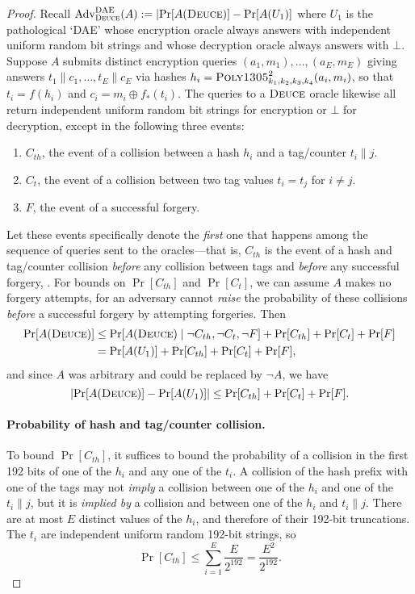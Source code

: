 \documentclass[draft]{article}
\def\operatorsc#1{{%
  \ifmmode\let\next=\operatorname\else\let\next=\relax\fi\next{\textsc{#1}}}}
\def\Poly#1/{\operatorsc{Poly#1}}
\def\Deuce/{\operatorsc{Deuce}}
\def\DAE{%
  \ifmmode\def\next{\operatorname{DAE}}%
    \else\def\next/{\textsc{dae}}%
  \fi\next}
\DeclareMathOperator{\Adv}{Adv}
\newcommand{\concat}{\mathbin\|}
\newcommand{\given}{\mathrel|}
\begin{document}
\begin{proof}

Recall
 $\Adv^{\DAE}_{\Deuce/}(A) := \lvert\Pr[A(\Deuce/)] - \Pr[A(U_1)]$
 where $U_1$ is the pathological `DAE' whose encryption oracle always
 answers with independent uniform random bit strings and whose
 decryption oracle always answers with $\bot$.
Suppose $A$ submits distinct encryption queries
 $(a_1, m_1), \dotsc, (a_E, m_E)$
 giving answers
 $t_1 \concat c_1, \dotsc, t_E \concat c_E$
 via hashes
 $h_i = \Poly1305/^2_{k_1,k_2,k_3,k_4}(a_i, m_i)$,
 so that
 $t_i = f(h_i)$
 and
 $c_i = m_i \oplus f_*(t_i)$.
The queries to a $\Deuce/$ oracle likewise all return independent
 uniform random bit strings for encryption or $\bot$ for decryption,
 except in the following three events:
%
\begin{enumerate}
  \item
    $C_{th}$, the event of a collision between a hash $h_i$ and a
     tag/counter $t_i \concat j$.
  \item
    $C_t$, the event of a collision between two tag values $t_i = t_j$
     for $i \ne j$.
  \item
    $F$, the event of a successful forgery.
\end{enumerate}
%
Let these events specifically denote the \emph{first} one that
 happens among the sequence of queries sent to the oracles---that is,
 $C_{th}$ is the event of a hash and tag/counter collision
 \emph{before} any collision between tags and \emph{before} any
 successful forgery, \etc.
For bounds on $\Pr[C_{th}]$ and $\Pr[C_t]$, we can assume $A$ makes no
 forgery attempts, for an adversary cannot \emph{raise} the probability
 of these collisions \emph{before} a successful forgery by attempting
 forgeries.
Then
%
\begin{align*}
  \Pr[A(\Deuce/)]
  &\leq \Pr[A(\Deuce/) \given \lnot C_{th}, \lnot C_t, \lnot F]
     + \Pr[C_{th}] + \Pr[C_t] + \Pr[F] \\
  &= \Pr[A(U_1)] + \Pr[C_{th}] + \Pr[C_t] + \Pr[F],
\end{align*}
%
 and since $A$ was arbitrary and could be replaced by $\lnot A$, we
 have
\[
  \lvert\Pr[A(\Deuce/)] - \Pr[A(U_1)]\rvert
  \leq \Pr[C_{th}] + \Pr[C_t] + \Pr[F].
\]

\paragraph*{Probability of hash and tag/counter collision.}
To bound $\Pr[C_{th}]$, it suffices to bound the probability of a
 collision in the first 192 bits of one of the $h_i$ and any one of the
 $t_i$.
A collision of the hash prefix with one of the tags may not
 \emph{imply} a collision between one of the $h_i$ and one of the $t_i
 \concat j$, but it is \emph{implied by} a collision and between one of
 the $h_i$ and $t_i \concat j$.
There are at most $E$ distinct values of the $h_i$, and therefore of
 their 192-bit truncations.
The $t_i$ are independent uniform random 192-bit strings, so
%
\[
  \Pr[C_{th}]
  \leq \sum_{i=1}^E \frac{E}{2^{192}}
  = \frac{E^2}{2^{192}}.
\]


\end{proof}
\end{document}
